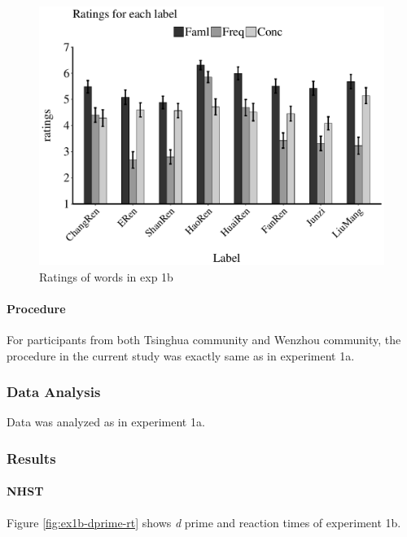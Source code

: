 \documentclass[
  english,
  man]{apa6}
\let\oldparagraph\paragraph
\renewcommand{\paragraph}[1]{\oldparagraph{#1}\mbox{}}
\begin{document}
\begin{figure}
\centering
\includegraphics[width=5.20833in,height=\textheight]{exp1b/Familiarity_ratings/df1b_fami_rating.pdf}
\caption{Ratings of words in exp 1b}
\end{figure}

\hypertarget{procedure-1}{%
\paragraph{Procedure}\label{procedure-1}}

For participants from both Tsinghua community and Wenzhou community, the procedure in the current study was exactly same as in experiment 1a.

\hypertarget{data-analysis-2}{%
\subsubsection{Data Analysis}\label{data-analysis-2}}

Data was analyzed as in experiment 1a.

\hypertarget{results-1}{%
\subsubsection{Results}\label{results-1}}

\hypertarget{nhst}{%
\paragraph{NHST}\label{nhst}}

Figure \ref{fig:ex1b-dprime-rt} shows \emph{d} prime and reaction times of experiment 1b.
\end{document}
